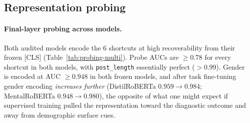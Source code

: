\documentclass[11pt]{article}
\begin{document}
\subsection{Representation probing}

\paragraph{Final-layer probing across models.}
Both audited models encode the 6 shortcuts at high recoverability from their frozen [CLS] (Table~\ref{tab:probing-multi}). Probe AUCs are $\geq 0.78$ for every shortcut in both models, with \texttt{post\_length} essentially perfect ($>0.99$). Gender is encoded at AUC $\geq 0.948$ in both frozen models, and after task fine-tuning gender encoding \emph{increases further} (DistilRoBERTa $0.959 \to 0.984$; MentalRoBERTa $0.948 \to 0.980$), the opposite of what one might expect if supervised training pulled the representation toward the diagnostic outcome and away from demographic surface cues.
\end{document}
